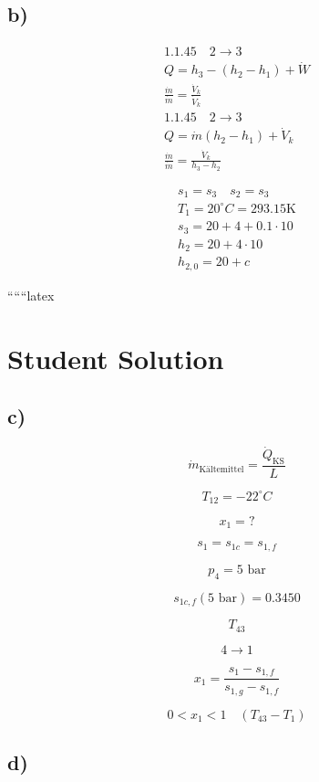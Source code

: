 \subsection*{b)}

\begin{align*}
    1.1.45 \quad 2 \rightarrow 3 \\
    Q = h_3 - (h_2 - h_1) + \dot{W} \\
    \frac{\dot{m}}{\dot{m}} = \frac{\dot{V}_k}{\dot{V}_k} \\
    1.1.45 \quad 2 \rightarrow 3 \\
    Q = \dot{m} (h_2 - h_1) + \dot{V}_k \\
    \frac{\dot{m}}{\dot{m}} = \frac{\dot{V}_k}{h_3 - h_2}
\end{align*}

\begin{align*}
    s_1 = s_3 \quad s_2 = s_3 \\
    T_1 = 20^\circ C = 293.15 \text{K} \\
    s_3 = 20 + 4 + 0.1 \cdot 10 \\
    h_2 = 20 + 4 \cdot 10 \\
    h_{2,0} = 20 + c
\end{align*}

``````latex


\section*{Student Solution}

\subsection*{c)}

\[
\dot{m}_{\text{Kältemittel}} = \frac{\dot{Q}_{\text{KS}}}{L}
\]

\[
T_{12} = -22^\circ C
\]

\[
x_1 = ?
\]

\[
s_1 = s_{1c} = s_{1,f}
\]

\[
p_4 = 5 \text{ bar}
\]

\[
s_{1c,f} (5 \text{ bar}) = 0.3450
\]

\[
T_{43}
\]

\[
4 \rightarrow 1
\]

\[
x_1 = \frac{s_1 - s_{1,f}}{s_{1,g} - s_{1,f}}
\]

\[
0 < x_1 < 1 \quad (T_{43} - T_{1})
\]

\subsection*{d)}

